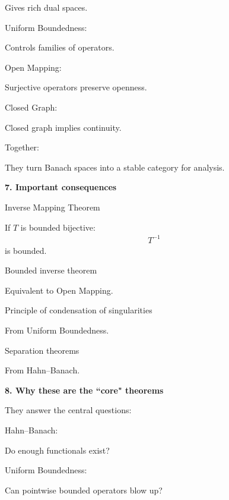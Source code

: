 \documentclass[12pt,a4paper]{report}
\begin{document}
\begin{description}
\begin{description}
Gives rich dual spaces.

    \item Uniform Boundedness:

Controls families of operators.

    \item Open Mapping:

Surjective operators preserve openness.

    \item Closed Graph:

Closed graph implies continuity.

	\end{description}
Together:

\> They turn Banach spaces into a stable category for analysis.

\item \textbf{7. Important consequences}

	\begin{description}
    \item Inverse Mapping Theorem

If $T$ is bounded bijective:
\begin{align*}
T^{-1}
\end{align*}
is bounded.

    \item Bounded inverse theorem

Equivalent to Open Mapping.

    \item Principle of condensation of singularities

From Uniform Boundedness.

    \item Separation theorems

From Hahn–Banach.

	\end{description}

\item \textbf{8. Why these are the ``core" theorems}

They answer the central questions:

	\begin{description}
        \item Hahn–Banach:

Do enough functionals exist?

        \item Uniform Boundedness:

Can pointwise bounded operators blow up?


\end{description}
\end{description}
\end{document}
